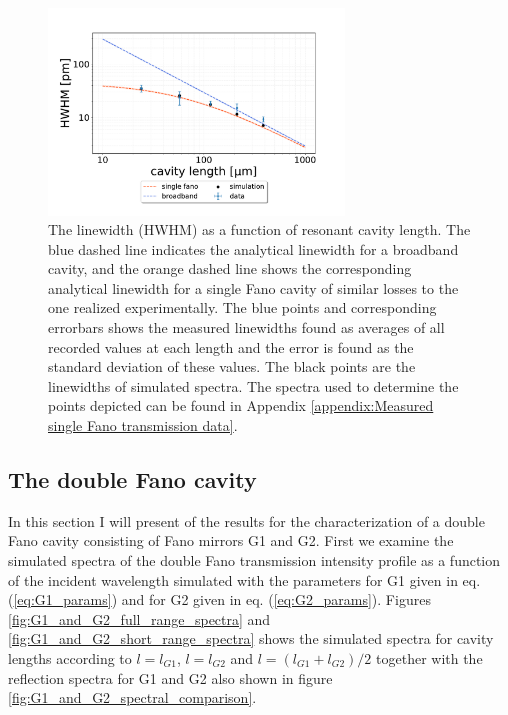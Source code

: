 \begin{figure}[h!]
    \centering
    \includegraphics[width=0.7\textwidth]{figures/results/HWHM_vs_cavity_length_single_fano.pdf}
    \caption{The linewidth (HWHM) as a function of resonant cavity length. The blue dashed line indicates the analytical linewidth for a broadband cavity, and the orange dashed line shows the corresponding analytical linewidth for a single Fano cavity of similar losses to the one realized experimentally. The blue points and corresponding errorbars shows the measured linewidths found as averages of all recorded values at each length and the error is found as the standard deviation of these values. The black points are the linewidths of simulated spectra. The spectra used to determine the points depicted can be found in Appendix \ref{appendix:Measured single Fano transmission data}.}
    \label{fig:HWHM_vs_length_single_fano_data}
\end{figure}

\clearpage
\subsection{The double Fano cavity}\label{sec:the_double_fano_cavity_results}

In this section I will present of the results for the characterization of a double Fano cavity consisting of Fano mirrors G1 and G2. First we examine the simulated spectra of the double Fano transmission intensity profile as a function of the incident wavelength simulated with the parameters for G1 given in eq. (\ref{eq:G1_params}) and for G2 given in eq. (\ref{eq:G2_params}). Figures \ref{fig:G1_and_G2_full_range_spectra} and \ref{fig:G1_and_G2_short_range_spectra} shows the simulated spectra for cavity lengths according to $l=l_{G1}$, $l=l_{G2}$ and $l=(l_{G1}+l_{G2})/2$ together with the reflection spectra for G1 and G2 also shown in figure \ref{fig:G1_and_G2_spectral_comparison}. 

